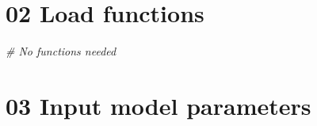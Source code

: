 \documentclass[
]{article}
\newenvironment{Shaded}{\begin{snugshade}}{\end{snugshade}}
\newcommand{\CommentTok}[1]{\textcolor[rgb]{0.56,0.35,0.01}{\textit{#1}}}
\begin{document}
\hypertarget{load-functions}{%
\section{02 Load functions}\label{load-functions}}

\begin{Shaded}
\begin{Highlighting}[]
\CommentTok{# No functions needed}
\end{Highlighting}
\end{Shaded}

\hypertarget{input-model-parameters}{%
\section{03 Input model parameters}\label{input-model-parameters}}
\end{document}
